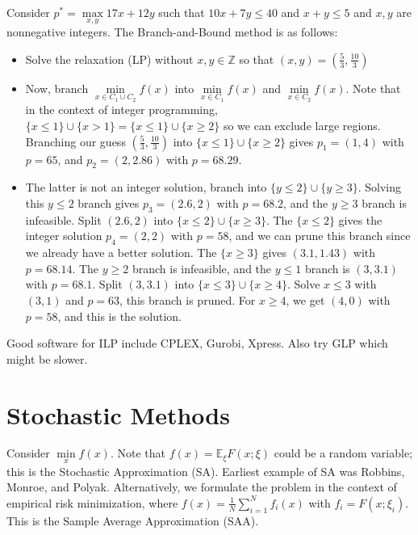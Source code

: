 \documentclass[english, 11pt]{article}
\begin{document}
    \begin{exmp}
 Consider $p^* = \max \limits_{x,y} 17x + 12 y$ such that $10x + 7y \le 40$ and $x + y \le 5$ and $x,y$ are nonnegative integers.
 The Branch-and-Bound method is as follows:
 \begin{itemize}
 \item Solve the relaxation (LP) without $x,y \in \mathbb{Z}$ so that $(x,y) = (\frac{5}{3}, \frac{10}{3})$
 \item Now, branch $\min \limits_{x \in C_1 \cup C_2} f(x)$ into $\min \limits_{x \in C_1} f(x)$ and $\min \limits_{x \in C_2} f(x)$. Note that in the context of integer programming, $\{x \le 1 \} \cup \{ x > 1 \} = \{ x \le 1 \} \cup \{ x \ge 2 \}$ so we can exclude large regions. Branching our guess $(\frac{5}{3}, \frac{10}{3})$ into $\{ x \le 1 \} \cup \{ x \ge 2 \}$ gives $p_1=(1,4)$ with $p = 65$, and $p_2 =  (2,2.86)$ with $p=68.29$.
 \item The latter is not an integer solution, branch into $\{ y \le 2 \} \cup \{ y \ge 3 \}$. Solving this $y \le 2$ branch gives $p_3 = (2.6,2)$ with $p = 68.2$, and the $y \ge 3$ branch is infeasible. Split $(2.6,2)$ into $\{ x \le 2 \} \cup \{x \ge 3\}$. The $\{x \le 2 \}$ gives the integer solution $p_4 = (2,2)$ with $p=58$, and we can prune this branch since we already have a better solution. The $\{ x \ge 3\}$ gives $(3.1,1.43)$ with $p=68.14$. The $y \ge 2$ branch is infeasible, and the $y \le 1$ branch is $(3,3.1)$ with $p=68.1$. Split $(3,3.1)$ into $\{x \le 3 \} \cup \{ x \ge 4 \}$. Solve $ x \le 3$ with $(3,1)$ and $p=63$, this branch is pruned. For $x \ge 4$, we get $(4,0)$ with $p = 58$, and this is the solution.
 \end{itemize}
 \end{exmp}
 
 
 \begin{rem}
 Good software for ILP include CPLEX, Gurobi, Xpress. Also try GLP which might be slower.
 \end{rem}
 
 
 
 \section{Stochastic Methods}
 Consider $\min \limits_x f(x)$. Note that $f(x) = \mathbb{E}_\xi F(x; \xi)$ could be a random variable; this is the Stochastic Approximation (SA).  Earliest example of SA was Robbins, Monroe, and Polyak. Alternatively, we formulate the problem in the context of empirical risk minimization, where $f(x) = \frac{1}{N} \sum_{i=1}^N f_i(x)$ with $f_i = F(x; \xi_i)$. This is the Sample Average Approximation (SAA).
 
\end{document}
